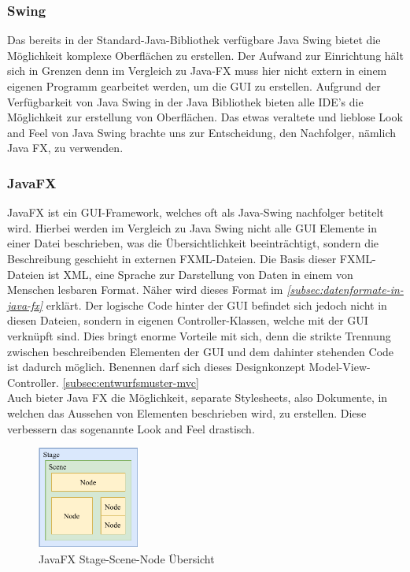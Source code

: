 \subsubsection{Swing}
Das bereits in der Standard-Java-Bibliothek verfügbare Java Swing bietet die Möglichkeit komplexe Oberflächen zu erstellen.
Der Aufwand zur Einrichtung hält sich in Grenzen denn im Vergleich zu Java-FX muss hier nicht extern in einem eigenen Programm gearbeitet werden, um die GUI zu erstellen.
Aufgrund der Verfügbarkeit von Java Swing in der Java Bibliothek bieten alle IDE's die Möglichkeit zur erstellung von Oberflächen.
Das etwas veraltete und lieblose Look and Feel von Java Swing brachte uns zur Entscheidung, den Nachfolger, nämlich Java FX, zu verwenden.
\subsubsection{JavaFX}\label{sssec: JavaFX}
JavaFX ist ein GUI-Framework, welches oft als Java-Swing nachfolger betitelt wird.
Hierbei werden im Vergleich zu Java Swing nicht alle GUI Elemente in einer Datei beschrieben, was die Übersichtlichkeit beeinträchtigt, sondern die Beschreibung geschieht in externen FXML-Dateien.
Die Basis dieser FXML-Dateien ist XML, eine Sprache zur Darstellung von Daten in einem von Menschen lesbaren Format.
Näher wird dieses Format im \textit{\autoref{subsec:datenformate-in-java-fx}} erklärt.
Der logische Code hinter der GUI befindet sich jedoch nicht in diesen Dateien, sondern in eigenen Controller-Klassen, welche mit der GUI verknüpft sind.
Dies bringt enorme Vorteile mit sich, denn die strikte Trennung zwischen beschreibenden Elementen der GUI
und dem dahinter stehenden Code ist dadurch möglich.
Benennen darf sich dieses Designkonzept Model-View-Controller. \autoref{subsec:entwurfsmuster-mvc}\\
Auch bieter Java FX die Möglichkeit, separate Stylesheets, also Dokumente, in welchen das Aussehen von Elementen beschrieben wird, zu erstellen.
Diese verbessern das sogenannte Look and Feel drastisch.

\begin{figure}[htb!]
    \centering
    \includegraphics[width=0.3\textwidth]{fig/ainf/JavaFXStageSceneNode.pdf}
    \caption{JavaFX Stage-Scene-Node Übersicht}
    \label{fig:Tool SceneBuilder}
\end{figure}
